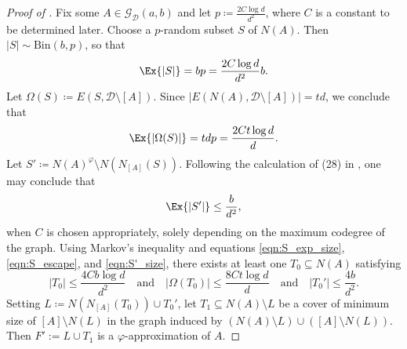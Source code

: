 \documentclass[reqno,a4paper,11pt]{amsart}
\newcommand{\cD}{\mathcal{D}}
\newcommand{\cG}{\mathcal{G}}
\begin{document}
\begin{proof}[Proof of ]
    Fix some $A\in\cG_{\cD}(a,b)$ and let $p \coloneqq \frac{2C \log d}{d^2}$, where $C$ is a constant to be determined later. Choose a $p$-random subset $S$ of $N(A)$. Then $|S| \sim \text{Bin}(b, p)$, so that
    \begin{equation}\label{eqn:S_exp_size}
    \Ex{|S|}=bp = \frac{2C \log d}{d^2} b.
    \end{equation}
    Let $\Omega(S) \coloneqq E(S, \cD \setminus [A])$. Since $|E(N(A), \cD \setminus [A])|=td$, we conclude that
    \begin{equation}\label{eqn:S_escape}
        \Ex{|\Omega(S)|} = t dp = \frac{2C t \log d}{d}.
    \end{equation}
    Let $S' \coloneqq N(A)^{\varphi} \setminus N(N_{[A]}(S))$. Following the calculation of (28) in \cite{galvin2019independent}, one may conclude that
    \begin{equation}\label{eqn:S'_size}
        \Ex{|S'|} \leq  \frac{b}{d^2},
    \end{equation}
    when $C$ is chosen appropriately, solely depending on the maximum codegree of the graph. Using Markov's inequality and equations \eqref{eqn:S_exp_size}, \eqref{eqn:S_escape}, and \eqref{eqn:S'_size}, there exists at least one $T_0 \subseteq N(A)$ satisfying
    \begin{equation*}
        |T_0| \leq \frac{4C b \log d}{d^2} \quad \text{and} \quad
        |\Omega(T_0)| \leq \frac{8Ct\log d}{d} \quad \text{and} \quad
        |T_0'| \leq \frac{4b}{d^2}.
    \end{equation*}
    Setting $L \coloneqq N(N_{[A]}(T_0)) \cup T_0'$, let $T_1 \subseteq N(A) \setminus L$ be a cover of minimum size of $[A] \setminus N(L)$ in the graph induced by $(N(A) \setminus L) \cup ([A] \setminus N(L))$. Then $F':=L\cup T_1$ is a $\varphi$-approximation of $A$. 
    

\end{proof}
\end{document}
